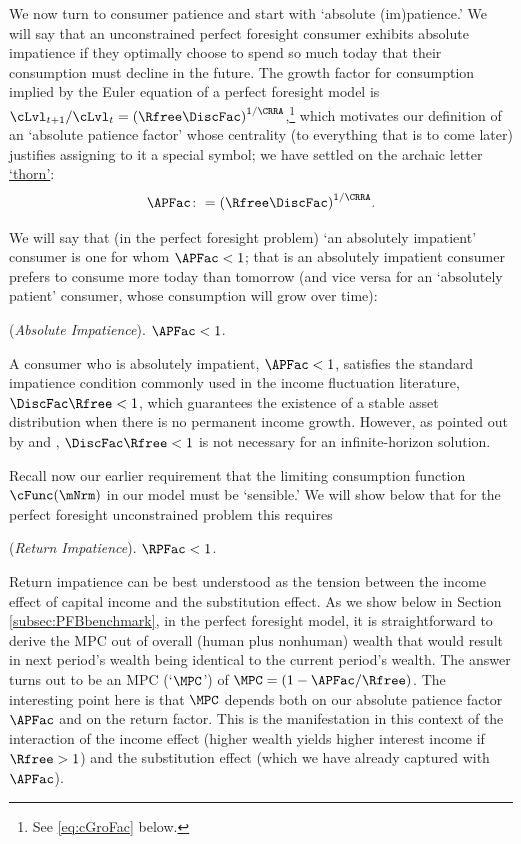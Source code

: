 \documentclass[\econtexRoot/BufferStockTheory]{subfiles}
\begin{document}
We now turn to consumer patience and start with `absolute (im)patience.'
We will say that an unconstrained perfect foresight consumer exhibits absolute impatience if they optimally choose to spend so much today that their consumption must decline in the future.
The growth factor for consumption implied by the Euler equation of a perfect foresight model is $\cLvl_{t+1}/\cLvl_{t} = {(\Rfree\DiscFac)}^{1/\CRRA}$,\footnote{See \eqref{eq:cGroFac} below.} which motivates our definition of an `absolute patience factor' whose centrality (to everything that is to come later) justifies assigning to it a special symbol; we have settled on the archaic letter \href{https://en.wikipedia.org/wiki/Thorn_(letter)}{`thorn'}:
\hypertarget{APFac}{}
\hypertarget{APFacDefn}{}
\begin{equation}\label{eq:APFac}
    \APFac \colon= {(\Rfree\DiscFac)}^{1/\CRRA}.
\end{equation}

We will say that (in the perfect foresight problem) `an absolutely impatient' consumer is one for whom $\APFac < 1$; that is an absolutely impatient consumer prefers to consume more today than tomorrow (and vice versa for an `absolutely patient' consumer, whose consumption will grow over time):
\hypertarget{AIC}{}
\begin{assumL} (\textit{Absolute Impatience}). \label{ass:AIC}
$\APFac  < 1$. 
\end{assumL}

A consumer who is absolutely impatient, $\APFac<1$, satisfies the standard impatience condition commonly used in the income fluctuation literature, $\DiscFac\Rfree<1$, which guarantees the existence of a stable asset distribution when there is no permanent income growth.
However, as pointed out by \cite{szeidlInvariant} and \cite{maUnboundedDP}, $\DiscFac\Rfree<1$ is not necessary for an infinite-horizon solution.

\hypertarget{RIC}{}
\hypertarget{RPFacDefn}{}
Recall now our earlier requirement that the limiting consumption function $\cFunc(\mNrm)$ in our model must be `sensible.'
We will show below that for the perfect foresight unconstrained problem this requires
\begin{assumL} (\textit{Return Impatience}).\label{ass:RIC}
$\RPFac  < 1$. 
\end{assumL}

Return impatience can be best understood as the tension between the income effect of capital income and the substitution effect.
As we show below in Section \ref{subsec:PFBbenchmark}, in the perfect foresight model, it is straightforward to derive the MPC out of overall (human plus nonhuman) wealth that would result in next period's wealth being identical to the current period's wealth.
The answer turns out to be an MPC (`$\MPC$') of $\MPC=(1-\APFac/\Rfree)$.
The interesting point here is that $\MPC$ depends both on our absolute patience factor $\APFac$ and on the return factor.
This is the manifestation in this context of the interaction of the income effect (higher wealth yields higher interest income if $\Rfree>1$) and the substitution effect (which we have already captured with $\APFac$).
\end{document}

